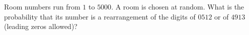 Room numbers run from $1$ to $5000$. A room is chosen at random. What is the probability that its number is a rearrangement of the digits of $0512$ or of $4913$ (leading zeros allowed)?
